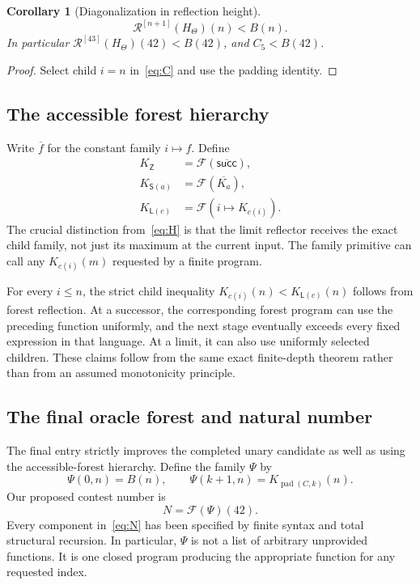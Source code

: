 \documentclass[11pt,a4paper]{article}
\newtheorem{corollary}[theorem]{Corollary}
\theoremstyle{definition}
\newcommand{\pad}{\operatorname{pad}}
\newcommand{\R}{\mathcal R}
\newcommand{\F}{\mathcal F}
\begin{document}
\begin{corollary}[Diagonalization in reflection height]
\[
            \R^{[n+1]}(H_\Theta)(n)<B(n).
\]
In particular \(\R^{[43]}(H_\Theta)(42)<B(42)\), and \(C_5<B(42)\).
\end{corollary}
\begin{proof}
Select child \(i=n\) in~\eqref{eq:C} and use the padding identity.
\end{proof}

\subsection{The accessible forest hierarchy}

Write \(\overline f\) for the constant family \(i\mapsto f\). Define
\begin{align}
 K_{\mathsf Z}&=\F(\overline{\mathsf{succ}}),\nonumber\\
 K_{\mathsf S(a)}&=\F(\overline{K_a}),\label{eq:K}\\
 K_{\mathsf L(c)}&=\F(i\mapsto K_{c(i)}).\nonumber
\end{align}
The crucial distinction from~\eqref{eq:H} is that the limit reflector
receives the exact child family, not just its maximum at the current input.
The family primitive can call any \(K_{c(i)}(m)\) requested by a finite program.

For every \(i\le n\), the strict child inequality
\(K_{c(i)}(n)<K_{\mathsf L(c)}(n)\) follows from forest reflection. At a
successor, the corresponding forest program can use the preceding function
uniformly, and the next stage eventually exceeds every fixed expression in
that language. At a limit, it can also use uniformly selected children.
These claims follow from the same exact finite-depth theorem rather than
from an assumed monotonicity principle.

\subsection{The final oracle forest and natural number}

The final entry strictly improves the completed unary candidate as well as
using the accessible-forest hierarchy. Define the family \(\Psi\) by
\begin{equation}
 \Psi(0,n)=B(n),\qquad
 \Psi(k+1,n)=K_{\pad(C,k)}(n).
 \label{eq:psi}
\end{equation}
Our proposed contest number is
\begin{equation}
                  \boxed{N=\F(\Psi)(42).}
 \label{eq:N}
\end{equation}
Every component in~\eqref{eq:N} has been specified by finite syntax and total
structural recursion. In particular, \(\Psi\) is not a list of arbitrary
unprovided functions. It is one closed program producing the appropriate
function for any requested index.
\end{document}
